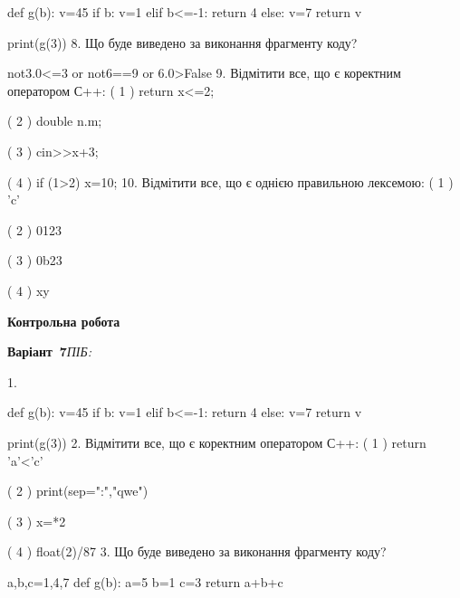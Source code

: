 \documentclass[11pt]{article}
\begin{document}
def g(b):
    v=45
    if b: 
        v=1
    elif b<=-1:
         return 4
    else:
         v=7
    return v

print(g(3))
\vspace{5mm}
8. Що буде виведено за виконання фрагменту коду?

not3.0<=3 or not6==9 or 6.0>False
\vspace{5mm}
9. %
Відмітити все, що є коректним оператором С++:
( 1 ) return x<=2;

( 2 ) double n.m;

( 3 ) cin>>x+3;

( 4 ) if (1>2) x=10;
\vspace{5mm}
10. %
Відмітити все, що є однією правильною лексемою:
( 1 ) 'c'

( 2 ) 0123

( 3 ) 0b23

( 4 ) xy
\vspace{5mm}










\newpage

\newpage

{\large\textbf{Контрольна робота}}

\textbf{Варіант \No\,7}\hfill \textit{ПІБ:}\,\underline{\hspace{60mm}}
\vspace{4mm}

1. 

def g(b):
    v=45
    if b: 
        v=1
    elif b<=-1:
         return 4
    else:
         v=7
    return v

print(g(3))
\vspace{5mm}
2. %
Відмітити все, що є коректним оператором С++:
( 1 ) return 'a'<'c'

( 2 ) print(sep=":","qwe")

( 3 ) x=*2

( 4 ) float(2)/87
\vspace{5mm}
3. Що буде виведено за виконання фрагменту коду?

a,b,c=1,4,7
def g(b):
    a=5
    b=1
    c=3
    return a+b+c
\end{document}
